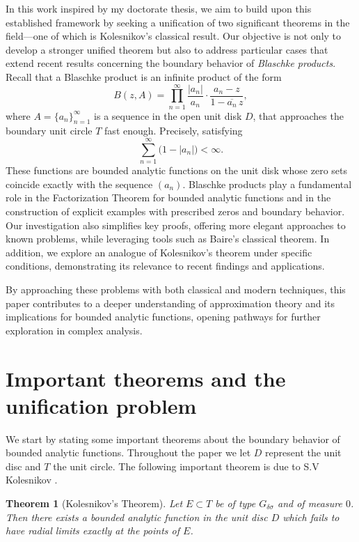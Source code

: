 \documentclass[12pt]{article}
\newtheorem{theorem}{Theorem}
\begin{document}
In this work inspired by my doctorate thesis\cite{Spy}, we aim to build upon this established framework by seeking a unification of two significant theorems in the field---one of which is Kolesnikov’s classical result. Our objective is not only to develop a stronger unified theorem but also to address particular cases that extend recent results concerning the boundary behavior of \emph{Blaschke products}. Recall that a Blaschke product is an infinite product of the form
\[
B(z,A) = \prod_{n=1}^{\infty} \frac{|a_n|}{a_n} \cdot \frac{a_n - z}{1 - \overline{a_n}\, z},
\]
where \(A=\lbrace{ a_n\rbrace}_{n=1}^\infty\) is a sequence in the open unit disk $D$, that approaches the boundary unit circle $T$ fast enough. Precisely, satisfying
\[
\sum_{n=1}^{\infty} \bigl(1 - |a_n|\bigr) < \infty.
\]
These functions are bounded analytic functions on the unit disk whose zero sets coincide exactly with the sequence \((a_n)\). Blaschke products play a fundamental role in the Factorization Theorem for bounded analytic functions and in the construction of explicit examples with prescribed zeros and boundary behavior.\\
Our investigation also simplifies key proofs, offering more elegant approaches to known problems, while leveraging tools such as Baire’s classical theorem. In addition, we explore an analogue of Kolesnikov’s theorem under specific conditions, demonstrating its relevance to recent findings and applications.


By approaching these problems with both classical and modern techniques, this paper contributes to a deeper understanding of approximation theory and its implications for bounded analytic functions, opening pathways for further exploration in complex analysis.

\section{Important theorems and the unification problem}
\noindent We start by stating some important theorems about the boundary behavior of bounded analytic functions. Throughout the paper we let $D$ represent the unit disc and $T$ the unit circle. The following important theorem is due to S.V Kolesnikov \cite{KO}.

\begin{theorem}[Kolesnikov's Theorem] Let $E\subset T$ be of type $G_{\delta\sigma}$ and of measure $0$. Then there exists a bounded analytic function in the unit disc $D$ which fails to have radial limits exactly at the points of $E$.
\end{theorem}
\end{document}
